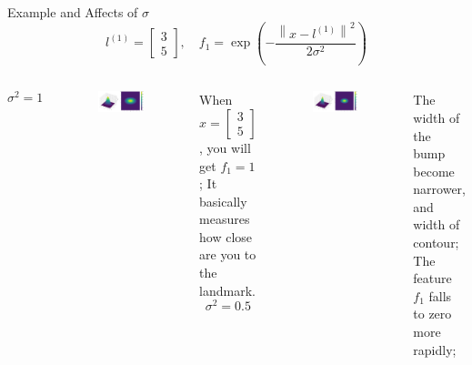 \documentclass[9pt,dvipsnames]{beamer}
\begin{document}
\begin{frame}{Example and Affects of \(\sigma\)}
	$$
	l^{(1)}=\left[\begin{array}{l}3 \\ 5\end{array}\right], \quad f_{1}=\exp \left(-\frac{\left\|x-l^{(1)}\right\|^{2}}{2 \sigma^{2}}\right)
	$$
	\begin{columns}[T]
		$$\sigma^{2}=1$$
		\begin{figure}
			\centering
			\includegraphics[width=\textwidth]{imgs/svm_10.png}
		\end{figure}
		When \(x=\left[\begin{array}{l}3 \\ 5\end{array}\right]\), you will get \(f_{1}=1\); It basically measures how close are you to the landmark.
		$$\sigma^{2}=0.5$$
		\begin{figure}
			\centering
			\includegraphics[width=\textwidth]{imgs/svm_11.png}
		\end{figure}
		The width of the bump become narrower, and width of contour; The feature \(f_{1}\) falls to zero more rapidly; 
	\end{columns}
\end{frame}
\end{document}
